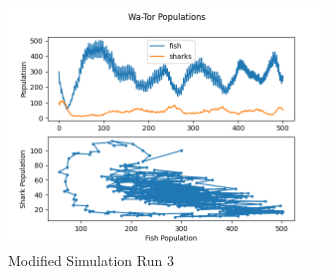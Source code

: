 \documentclass[12pt]{iopart} %
\begin{document}
\begin{figure}[htbp]
  \begin{center}
  \item[]\includegraphics[width=0.75\textwidth]{run6plots.png}
  \end{center}
  \caption{\label{fig:run6plots}
  Modified Simulation Run 3
  }
\end{figure}
\end{document}
